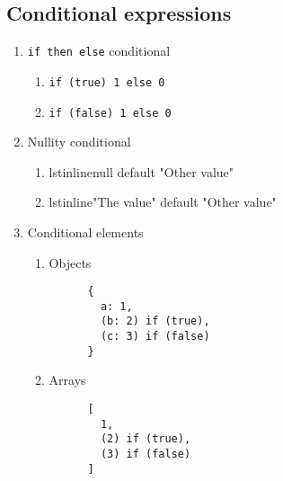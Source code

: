 \subsection{Conditional expressions}
\begin{enumerate}[resume*]
\item \texttt{if then else} conditional
  \begin{enumerate}
  \item \texttt{if (true) 1 else 0}
  \item \texttt{if (false) 1 else 0}
  \end{enumerate}
\item Nullity conditional
  \begin{enumerate}
  \item lstinline{null default "Other value"}
  \item lstinline{"The value" default "Other value"}
  \end{enumerate}
\item Conditional elements
  \begin{enumerate}
  \item Objects
    \begin{lstlisting}
      {
        a: 1,
        (b: 2) if (true),
        (c: 3) if (false)
      }
    \end{lstlisting}
  \item Arrays
    \begin{lstlisting}
      [
        1, 
        (2) if (true),
        (3) if (false)
      ]
    \end{lstlisting}
  \end{enumerate}
\end{enumerate}
